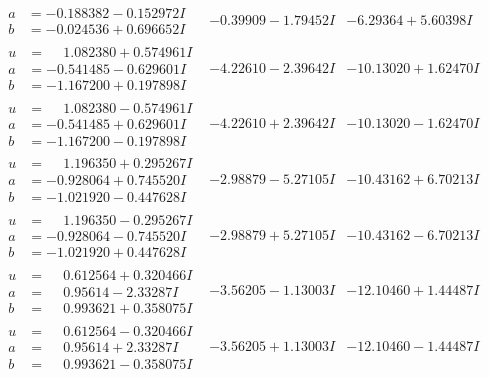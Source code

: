 \documentclass[1p]{elsarticle_modified}
\theoremstyle{definition}
\begin{document}
$$\begin{array}{c|c|c}
\begin{aligned}
a &= -0.188382 - 0.152972 I \\
b &= -0.024536 + 0.696652 I\end{aligned}
 & -0.39909 - 1.79452 I & -6.29364 + 5.60398 I \\ \hline\begin{aligned}
u &= \phantom{-}1.082380 + 0.574961 I \\
a &= -0.541485 - 0.629601 I \\
b &= -1.167200 + 0.197898 I\end{aligned}
 & -4.22610 - 2.39642 I & -10.13020 + 1.62470 I \\ \hline\begin{aligned}
u &= \phantom{-}1.082380 - 0.574961 I \\
a &= -0.541485 + 0.629601 I \\
b &= -1.167200 - 0.197898 I\end{aligned}
 & -4.22610 + 2.39642 I & -10.13020 - 1.62470 I \\ \hline\begin{aligned}
u &= \phantom{-}1.196350 + 0.295267 I \\
a &= -0.928064 + 0.745520 I \\
b &= -1.021920 - 0.447628 I\end{aligned}
 & -2.98879 - 5.27105 I & -10.43162 + 6.70213 I \\ \hline\begin{aligned}
u &= \phantom{-}1.196350 - 0.295267 I \\
a &= -0.928064 - 0.745520 I \\
b &= -1.021920 + 0.447628 I\end{aligned}
 & -2.98879 + 5.27105 I & -10.43162 - 6.70213 I \\ \hline\begin{aligned}
u &= \phantom{-}0.612564 + 0.320466 I \\
a &= \phantom{-}0.95614 - 2.33287 I \\
b &= \phantom{-}0.993621 + 0.358075 I\end{aligned}
 & -3.56205 - 1.13003 I & -12.10460 + 1.44487 I \\ \hline\begin{aligned}
u &= \phantom{-}0.612564 - 0.320466 I \\
a &= \phantom{-}0.95614 + 2.33287 I \\
b &= \phantom{-}0.993621 - 0.358075 I\end{aligned}
 & -3.56205 + 1.13003 I & -12.10460 - 1.44487 I \\ \hline\begin{aligned}

\end{aligned}
\end{array}$$
\end{document}

